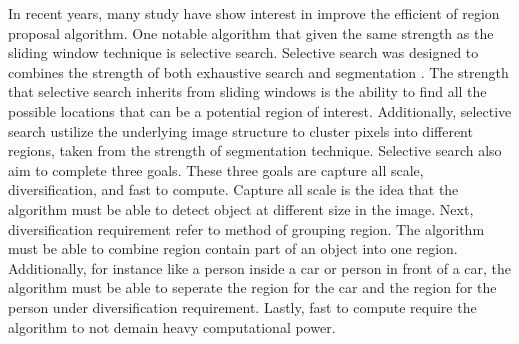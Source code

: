 In recent years, many study have show interest in improve the efficient of region proposal algorithm. One notable algorithm that given the same strength as the sliding window technique is selective search. Selective search was designed to combines the strength of both exhaustive search and segmentation \cite{uijlings_selective_search_2013}. The strength that selective search inherits from sliding windows is the ability to find all the possible locations that can be a potential region of interest. Additionally, selective search ustilize the underlying image structure to cluster pixels into different regions, taken from the strength of segmentation technique. Selective search also aim to complete three goals. These three goals are capture all scale, diversiﬁcation, and fast to compute. Capture all scale is the idea that the algorithm must be able to detect object at different size in the image. Next, diversiﬁcation requirement refer to method of grouping region. The algorithm must be able to combine region contain part of an object into one region. Additionally, for instance like a person inside a car or person in front of a car, the algorithm must be able to seperate the region for the car and the region for the person under diversiﬁcation requirement. Lastly, fast to compute require the algorithm to not demain heavy computational power.

